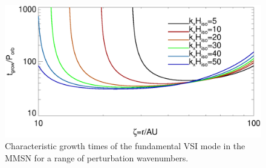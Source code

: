 \begin{figure}
  \includegraphics[width=\linewidth]{figures/eigen_compare_grow.ps}
  \caption{Characteristic growth times of the fundamental VSI mode in
    the MMSN for a range of perturbation wavenumbers.  
    \label{mmsn_overall}}    
\end{figure}









